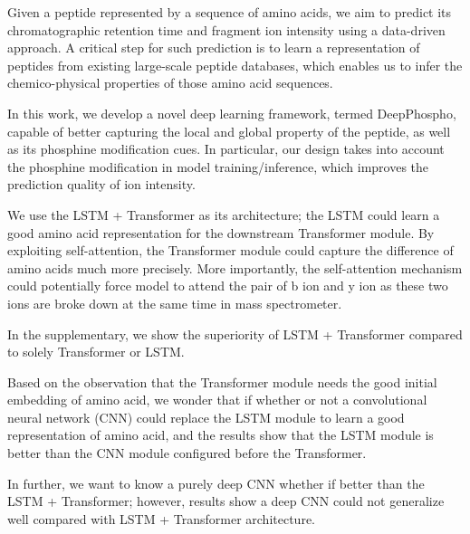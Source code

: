 
Given a peptide represented by a sequence of amino acids, we aim to predict its chromatographic retention time and fragment ion intensity using a data-driven approach. A critical step for such prediction is to learn a representation of peptides from existing large-scale peptide databases, which enables us to infer the chemico-physical properties of those amino acid sequences. 

In this work, we develop a novel deep learning framework, termed DeepPhospho, capable of better capturing the local and global property of the peptide, as well as its phosphine modification cues. 
In particular, our design takes into account the phosphine modification in model training/inference, which improves the prediction quality of ion intensity.   

 





We use the LSTM + Transformer as its architecture; the LSTM could learn a good amino acid representation for the downstream Transformer module. By exploiting self-attention, the Transformer module could capture the difference of amino acids much more precisely. More importantly, the self-attention mechanism could potentially force model to attend the pair of b ion and y ion as these two ions are broke down at the same time in mass spectrometer.

In the supplementary, we show the superiority of LSTM + 
Transformer compared to solely Transformer or LSTM. 

Based on the observation that the Transformer module needs 
the good initial embedding of amino acid, we wonder that if whether or not a convolutional neural network (CNN) 
could replace the LSTM module to learn a good representation of amino acid, and the results show that the LSTM module is better than the CNN module configured before the Transformer. 

In further, we want to know a purely deep CNN whether if better than the LSTM + Transformer; however, results show a deep CNN could not generalize well compared with LSTM + Transformer architecture.

